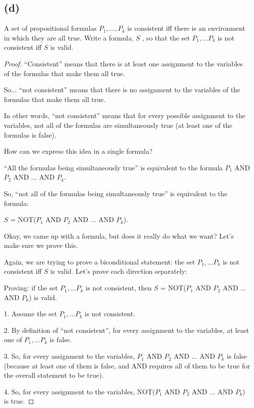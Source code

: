 \documentclass[14pt]{extarticle}
\begin{document}
\subsection{(d)}
A set of propositional formulas $P_1, \ldots, P_k$ is consistent iff there is an environment in which they are all true. Write a formula, $S$ , so that the set $P_1, \ldots P_k$ is not consistent iff $S$ is valid.
\begin{proof}
``Consistent'' means that there is at least one assignment to the variables of the formulas that make them all true.

So... ``not consistent'' means that there is no assignment to the variables of the formulas that make them all true.

In other words, ``not consistent'' means that for every possible assignment to the variables, not all of the formulas are simultaneously true (at least one of the formulas is false).

How can we express this idea in a single formula? 

``All the formulas being simultaneously true'' is equivalent to the formula $P_1$ AND $P_2$ AND $\ldots$ AND $P_k$.

So, ``not all of the formulas being simultaneously true'' is equivalent to the formula:

$S$ = NOT($P_1$ AND $P_2$ AND $\ldots$ AND $P_k$).

Okay, we came up with a formula, but does it really do what we want? Let's make sure we prove this. 

Again, we are trying to prove a biconditional statement: the set $P_1, \ldots P_k$ is not consistent iff $S$ is valid. Let's prove each direction separately:

Proving: if the set $P_1, \ldots P_k$ is not consistent, then $S$ = NOT($P_1$ AND $P_2$ AND $\ldots$ AND $P_k$) is valid.

1. Assume the set $P_1, \ldots P_k$ is not consistent.

2. By definition of ``not consistent'', for every assignment to the variables, at least one of $P_1, \ldots P_k$ is false.

3. So, for every assignment to the variables, $P_1$ AND $P_2$ AND $\ldots$ AND $P_k$ is false (because at least one of them is false, and AND requires all of them to be true for the overall statement to be true).

4. So, for every assignment to the variables, NOT($P_1$ AND $P_2$ AND $\ldots$ AND $P_k$) is true.


\end{proof}
\end{document}
